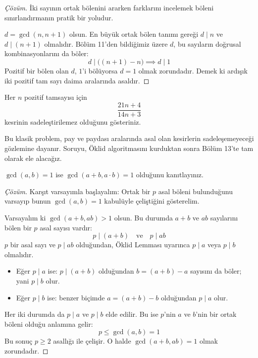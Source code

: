 \begin{proof}[Çözüm]
İki sayının ortak bölenini ararken farklarını incelemek böleni sınırlandırmanın pratik bir yoludur.

$d = \gcd(n, n+1)$ olsun.
En büyük ortak bölen tanımı gereği $d \mid n$ ve $d \mid (n+1)$ olmalıdır.
Bölüm 11'den bildiğimiz üzere $d$, bu sayıların doğrusal kombinasyonlarını da böler:
\[ d \mid \big( (n+1) - n \big) \implies d \mid 1 \]
Pozitif bir bölen olan $d$, $1$'i bölüyorsa $d = 1$ olmak zorundadır.
Demek ki ardışık iki pozitif tam sayı daima aralarında asaldır.
\end{proof}

\begin{example}
Her $n$ pozitif tamsayısı için
\[ \frac{21n + 4}{14n + 3} \]
kesrinin sadeleştirilemez olduğunu gösteriniz.
\end{example}

Bu klasik problem, pay ve paydası aralarında asal olan kesirlerin sadeleşemeyeceği
gözlemine dayanır. Soruyu, Öklid algoritmasını kurduktan sonra Bölüm 13'te tam
olarak ele alacağız.

\begin{example}
$\gcd(a, b) = 1$ ise $\gcd(a+b, a \cdot b) = 1$ olduğunu kanıtlayınız.
\end{example}

\begin{proof}[Çözüm]
Karşıt varsayımla başlayalım: Ortak bir $p$ asal böleni bulunduğunu varsayıp bunun $\gcd(a, b) = 1$ kabulüyle çeliştiğini gösterelim.

Varsayalım ki $\gcd(a+b, ab) > 1$ olsun. Bu durumda $a+b$ ve $ab$ sayılarını bölen bir $p$ asal sayısı vardır:
\[ p \mid (a+b) \quad \text{ve} \quad p \mid ab \]
$p$ bir asal sayı ve $p \mid ab$ olduğundan, Öklid Lemması uyarınca $p \mid a$ veya $p \mid b$ olmalıdır.
\begin{itemize}
    \item Eğer $p \mid a$ ise: $p \mid (a+b)$ olduğundan $b = (a+b) - a$ sayısını da böler; yani $p \mid b$ olur.
    \item Eğer $p \mid b$ ise: benzer biçimde $a = (a+b) - b$ olduğundan $p \mid a$ olur.
\end{itemize}
Her iki durumda da $p \mid a$ ve $p \mid b$ elde edilir. Bu ise $p$'nin $a$ ve $b$'nin bir ortak böleni olduğu anlamına gelir:
\[ p \le \gcd(a, b) = 1 \]
Bu sonuç $p \ge 2$ asallığı ile çelişir. O halde $\gcd(a+b, ab) = 1$ olmak zorundadır.
\end{proof}

